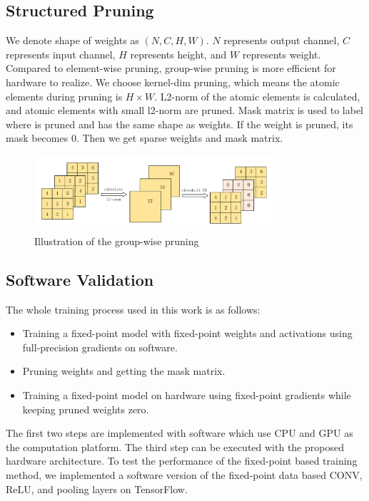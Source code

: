 \subsection{Structured Pruning}

We denote shape of weights as $(N, C, H, W)$. $N$ represents output channel, $C$ represents input channel, $H$ represents height, and $W$ represents weight. Compared to element-wise pruning, group-wise pruning is more efficient for hardware to realize. We choose kernel-dim pruning, which means the atomic elements during pruning is $H \times W$. L2-norm of the atomic elements is calculated, and atomic elements with small l2-norm are pruned. Mask matrix is used to label where is pruned and has the same shape as weights. If the weight is pruned, its mask becomes 0. Then we get sparse weights and mask matrix. 

\begin{figure}[tb]
    \centering\includegraphics[width=3.5in]{figures/prune-light.pdf}
    \caption{Illustration of the group-wise pruning}\label{fig:prune}
\end{figure}



\subsection{Software Validation}

The whole training process used in this work is as follows:
\begin{itemize}
\item Training a fixed-point model with fixed-point weights and activations using full-precision gradients on software.
\item Pruning weights and getting the mask matrix.
\item Training a fixed-point model on hardware using fixed-point gradients while keeping pruned weights zero.
\end{itemize}

The first two steps are implemented with software which use CPU and GPU as the computation platform. The third step can be executed with the proposed hardware architecture. To test the performance of the fixed-point based training method, we implemented a software version of the fixed-point data based CONV, ReLU, and pooling layers on TensorFlow.

